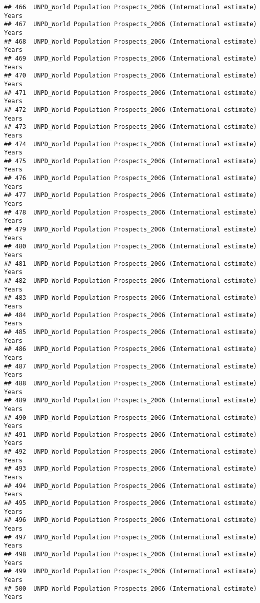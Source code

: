 \documentclass[]{article}
\begin{document}
\begin{verbatim}
## 466  UNPD_World Population Prospects_2006 (International estimate) Years
## 467  UNPD_World Population Prospects_2006 (International estimate) Years
## 468  UNPD_World Population Prospects_2006 (International estimate) Years
## 469  UNPD_World Population Prospects_2006 (International estimate) Years
## 470  UNPD_World Population Prospects_2006 (International estimate) Years
## 471  UNPD_World Population Prospects_2006 (International estimate) Years
## 472  UNPD_World Population Prospects_2006 (International estimate) Years
## 473  UNPD_World Population Prospects_2006 (International estimate) Years
## 474  UNPD_World Population Prospects_2006 (International estimate) Years
## 475  UNPD_World Population Prospects_2006 (International estimate) Years
## 476  UNPD_World Population Prospects_2006 (International estimate) Years
## 477  UNPD_World Population Prospects_2006 (International estimate) Years
## 478  UNPD_World Population Prospects_2006 (International estimate) Years
## 479  UNPD_World Population Prospects_2006 (International estimate) Years
## 480  UNPD_World Population Prospects_2006 (International estimate) Years
## 481  UNPD_World Population Prospects_2006 (International estimate) Years
## 482  UNPD_World Population Prospects_2006 (International estimate) Years
## 483  UNPD_World Population Prospects_2006 (International estimate) Years
## 484  UNPD_World Population Prospects_2006 (International estimate) Years
## 485  UNPD_World Population Prospects_2006 (International estimate) Years
## 486  UNPD_World Population Prospects_2006 (International estimate) Years
## 487  UNPD_World Population Prospects_2006 (International estimate) Years
## 488  UNPD_World Population Prospects_2006 (International estimate) Years
## 489  UNPD_World Population Prospects_2006 (International estimate) Years
## 490  UNPD_World Population Prospects_2006 (International estimate) Years
## 491  UNPD_World Population Prospects_2006 (International estimate) Years
## 492  UNPD_World Population Prospects_2006 (International estimate) Years
## 493  UNPD_World Population Prospects_2006 (International estimate) Years
## 494  UNPD_World Population Prospects_2006 (International estimate) Years
## 495  UNPD_World Population Prospects_2006 (International estimate) Years
## 496  UNPD_World Population Prospects_2006 (International estimate) Years
## 497  UNPD_World Population Prospects_2006 (International estimate) Years
## 498  UNPD_World Population Prospects_2006 (International estimate) Years
## 499  UNPD_World Population Prospects_2006 (International estimate) Years
## 500  UNPD_World Population Prospects_2006 (International estimate) Years

\end{verbatim}
\end{document}
